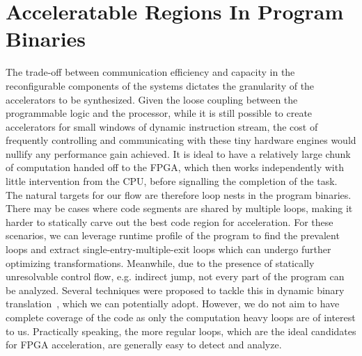 \section{Acceleratable Regions In Program Binaries}
The trade-off between communication efficiency and capacity
in the reconfigurable components of the systems dictates
the granularity of the accelerators to be synthesized. 
Given the loose coupling between the programmable logic and the processor,
while it is still possible to create accelerators for small windows of dynamic instruction stream, the cost of frequently controlling and communicating
with these tiny hardware engines would nullify any performance gain
achieved. 
It is ideal to have a relatively large chunk of computation
handed off to the FPGA, which then works independently with little
intervention from the CPU, before signalling the completion of the task.
The natural targets for our flow are therefore loop nests in the program
binaries. There may be cases where code segments are shared by multiple loops, making it harder to statically carve out the best code region for acceleration. For these
scenarios, we can leverage runtime profile of the program to find the prevalent
loops and extract single-entry-multiple-exit loops which can undergo further
optimizing transformations. 
Meanwhile, due to the presence of statically unresolvable control flow, e.g. indirect jump,
not every part of the program can be analyzed. Several techniques were
proposed to tackle this in dynamic binary translation~\cite{Hiser:2007:EIB:1251974.1252530}, which we can potentially
adopt. However, we do not aim to have complete coverage of the code as only the
computation heavy loops are of interest to us.
Practically speaking, the more regular loops, which are the ideal candidates for FPGA acceleration, are generally easy to detect and analyze. 



